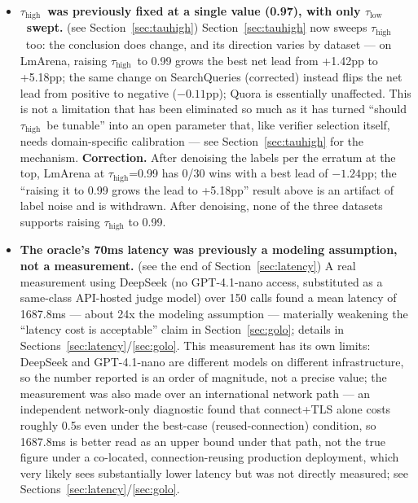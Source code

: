 \documentclass[11pt]{article}
\newcommand{\taulow}{\ensuremath{\tau_{\text{low}}}}
\newcommand{\tauhigh}{\ensuremath{\tau_{\text{high}}}}
\begin{document}
\begin{itemize}[leftmargin=*]
  \item \textbf{\tauhigh\ was previously fixed at a single value (0.97), with only \taulow\ swept.} (see Section~\ref{sec:tauhigh}) Section~\ref{sec:tauhigh} now sweeps \tauhigh\ too: the conclusion does change, and its direction varies by dataset --- on LmArena, raising \tauhigh\ to 0.99 grows the best net lead from +1.42pp to +5.18pp; the same change on SearchQueries (corrected) instead flips the net lead from positive to negative ($-0.11$pp); Quora is essentially unaffected. This is not a limitation that has been eliminated so much as it has turned ``should \tauhigh\ be tunable'' into an open parameter that, like verifier selection itself, needs domain-specific calibration --- see Section~\ref{sec:tauhigh} for the mechanism. \textbf{Correction.} After denoising the labels per the erratum at the top, LmArena at \tauhigh{}=0.99 has 0/30 wins with a best lead of $-1.24$pp; the ``raising it to 0.99 grows the lead to +5.18pp'' result above is an artifact of label noise and is withdrawn. After denoising, none of the three datasets supports raising \tauhigh{} to 0.99.
  \item \textbf{The oracle's 70ms latency was previously a modeling assumption, not a measurement.} (see the end of Section~\ref{sec:latency}) A real measurement using DeepSeek (no GPT-4.1-nano access, substituted as a same-class API-hosted judge model) over 150 calls found a mean latency of 1687.8ms --- about 24x the modeling assumption --- materially weakening the ``latency cost is acceptable'' claim in Section~\ref{sec:golo}; details in Sections~\ref{sec:latency}/\ref{sec:golo}. This measurement has its own limits: DeepSeek and GPT-4.1-nano are different models on different infrastructure, so the number reported is an order of magnitude, not a precise value; the measurement was also made over an international network path --- an independent network-only diagnostic found that connect+TLS alone costs roughly 0.5s even under the best-case (reused-connection) condition, so 1687.8ms is better read as an upper bound under that path, not the true figure under a co-located, connection-reusing production deployment, which very likely sees substantially lower latency but was not directly measured; see Sections~\ref{sec:latency}/\ref{sec:golo}.

\end{itemize}
\end{document}
